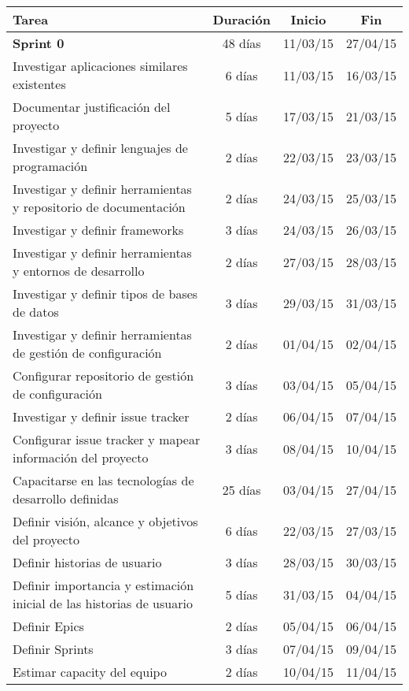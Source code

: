 {
\scriptsize
\begin{longtable}{|p{9cm}|c|c|c|}
    \hline
        \textbf{Tarea} &
        \textbf{Duración} &
        \textbf{Inicio} &
        \textbf{Fin} \\
    \hline
    \endhead
        \textbf{Sprint 0} & 48 días & 11/03/15 & 27/04/15 \\
    \hline
          Investigar aplicaciones similares existentes & 6 días & 11/03/15 & 16/03/15 \\ \hline
  Documentar justificación del proyecto & 5 días & 17/03/15 & 21/03/15 \\ \hline
  Investigar y definir lenguajes de programación & 2 días & 22/03/15 & 23/03/15 \\ \hline
  Investigar y definir herramientas y repositorio de documentación & 2 días & 24/03/15 & 25/03/15 \\ \hline
  Investigar y definir frameworks & 3 días & 24/03/15 & 26/03/15 \\ \hline
  Investigar y definir herramientas y entornos de desarrollo & 2 días & 27/03/15 & 28/03/15 \\ \hline
  Investigar y definir tipos de bases de datos & 3 días & 29/03/15 & 31/03/15 \\ \hline
  Investigar y definir herramientas de gestión de configuración & 2 días & 01/04/15 & 02/04/15 \\ \hline
  Configurar repositorio de gestión de configuración & 3 días & 03/04/15 & 05/04/15 \\ \hline
  Investigar y definir issue tracker & 2 días & 06/04/15 & 07/04/15 \\ \hline
  Configurar issue tracker y mapear información del proyecto & 3 días & 08/04/15 & 10/04/15 \\ \hline
  Capacitarse en las tecnologías de desarrollo definidas & 25 días & 03/04/15 & 27/04/15 \\ \hline
  Definir visión, alcance y objetivos del proyecto & 6 días & 22/03/15 & 27/03/15 \\ \hline
  Definir historias de usuario & 3 días & 28/03/15 & 30/03/15 \\ \hline
  Definir importancia y estimación inicial de las historias de usuario & 5 días & 31/03/15 & 04/04/15 \\ \hline
  Definir Epics & 2 días & 05/04/15 & 06/04/15 \\ \hline
  Definir Sprints & 3 días & 07/04/15 & 09/04/15 \\ \hline
  Estimar capacity del equipo & 2 días & 10/04/15 & 11/04/15 \\ \hline

\end{longtable}}
